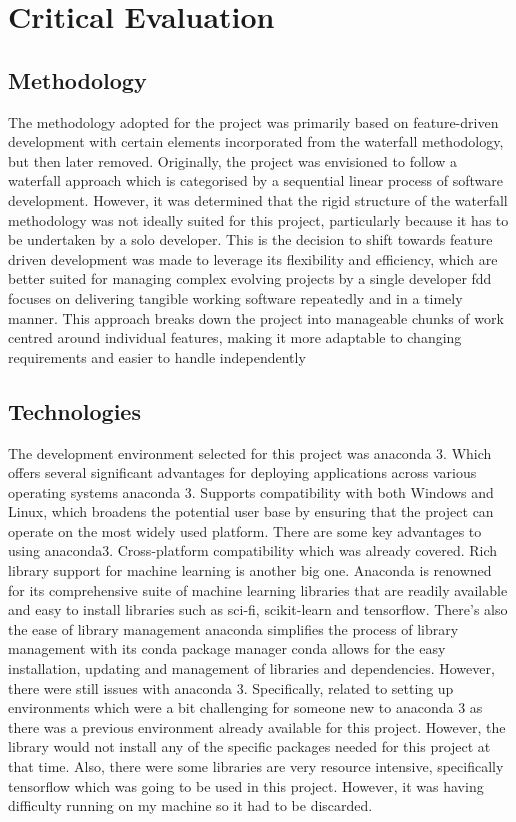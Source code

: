 \chapter{Critical Evaluation}\label{ch:critical-evaluation}


\section{Methodology}\label{sec:methodolody}

The methodology
adopted for the project was primarily based on feature-driven development with certain elements incorporated from the waterfall methodology,
but then later removed.
Originally, the project was envisioned to follow a waterfall approach which is categorised by a sequential linear process of software development.
However, it was determined that the rigid structure of the waterfall methodology was not ideally suited for this project, particularly because it has to be undertaken by a solo developer.
This is the decision to shift towards feature driven development was made to leverage its flexibility and efficiency\cite{softwareTesting2022}, which are better suited for managing complex evolving projects by a single developer fdd focuses on delivering tangible working software repeatedly and in a timely manner.
This approach breaks down the project into manageable chunks of work centred around individual features,
making it more adaptable to changing requirements and easier to handle independently

\section{Technologies}\label{sec:technologies}

The development environment selected for this project was anaconda 3.
Which offers several significant advantages for deploying applications across various operating systems anaconda 3.
Supports compatibility with both Windows and Linux, which broadens the potential user base by ensuring that the project can operate on the most widely used platform.
There are some key advantages to using anaconda3.
Cross-platform compatibility which was already covered.
Rich library support for machine learning is another big one.
Anaconda is renowned for its comprehensive suite of machine learning libraries that are readily available and easy to install libraries such as sci-fi, scikit-learn and tensorflow.
There's also the ease of library management anaconda simplifies the process of library management with its conda package manager conda allows for the easy installation, updating and management of libraries and dependencies.
However, there were still issues with anaconda 3.
Specifically, related to setting up environments which were a bit challenging for someone new to anaconda 3 as there was a previous environment already available for this project.
However, the library would not install any of the specific packages needed for this project at that time.
Also, there were some libraries are very resource intensive, specifically tensorflow which was going to be used in this project.
However, it was having difficulty running on my machine so it had to be discarded.

